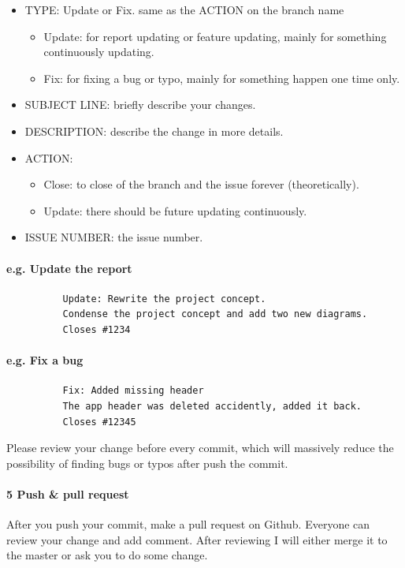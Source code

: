 \documentclass[12pt,a4paper]{article}
\begin{document}
\begin{appendices}
      \begin{itemize}
        \item TYPE: Update or Fix. same as the ACTION on the branch name
          \begin{itemize}
            \item Update: for report updating or feature updating, mainly for something continuously updating.
            \item Fix: for fixing a bug or typo, mainly for something happen one time only.
          \end{itemize}
        \item SUBJECT LINE: briefly describe your changes.
        \item DESCRIPTION: describe the change in more details.
        \item ACTION:
        \begin{itemize}
          \item Close: to close of the branch and the issue forever (theoretically).
          \item Update: there should be future updating continuously.
        \end{itemize}
        \item ISSUE NUMBER: the issue number.
      \end{itemize}

      \paragraph{e.g. Update the report}
        \begin{verbatim}
          Update: Rewrite the project concept.
          Condense the project concept and add two new diagrams.
          Closes #1234
        \end{verbatim}
        
      \paragraph{e.g. Fix a bug}
        \begin{verbatim}
          Fix: Added missing header
          The app header was deleted accidently, added it back.
          Closes #12345
        \end{verbatim}
        Please review your change before every commit, which will massively reduce the possibility of finding bugs or typos after push the commit.
      
      \paragraph{5 Push \& pull request}
        After you push your commit, make a pull request on Github. Everyone can review your change and add comment. After reviewing I will either merge it to the master or ask you to do some change.  
    

\end{appendices}
\end{document}
